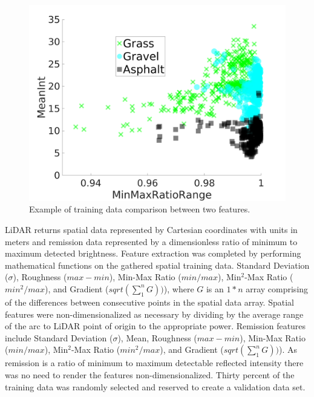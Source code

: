 \documentclass[journal,onecolumn]{IEEEtran}
\begin{document}

			\begin{figure}[H]
			\centering
			\includegraphics[width=0.75\linewidth]{figures/training_data_cluster_3}
			\caption[Example Clustering]{Example of training data comparison between two features.}
			\label{fig:training_data_cluster_2}
			\end{figure}
	
			{LiDAR returns spatial data represented by Cartesian coordinates with units in meters and remission data represented by a dimensionless ratio of minimum to maximum detected brightness. Feature extraction was completed by performing mathematical functions on the gathered spatial training data. Standard Deviation ($\sigma$), Roughness ($max - min$), Min-Max Ratio ($min / max$), Min$^{2}$-Max Ratio ($min^2 / max$), and Gradient ($sqrt(\sum_{1}^{n} G))$), where $G$ is an $1*n$ array comprising of the differences between consecutive points in the spatial data array. Spatial features were non-dimensionalized as necessary by dividing by the average range of the arc to LiDAR point of origin to the appropriate power. Remission features include Standard Deviation ($\sigma$), Mean, Roughness ($max - min$), Min-Max Ratio ($min / max$), Min$^{2}$-Max Ratio ($min^2 / max$), and Gradient ($sqrt(\sum_{1}^{n} G))$). As remission is a ratio of minimum to maximum detectable reflected intensity there was no need to render the features non-dimensionalized. Thirty percent of the training data was randomly selected and reserved to create a validation data set.} 
	
\end{document}
